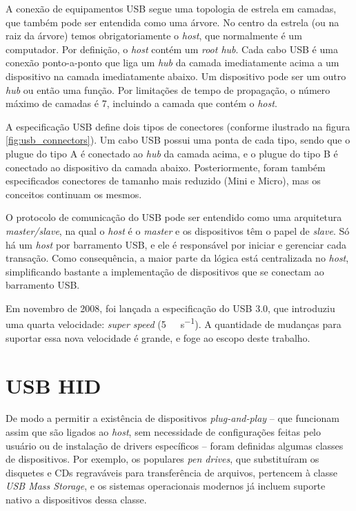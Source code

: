 \documentclass[brazil,pagestart=firstchapter]{abnt}
\begin{document}
A conexão de equipamentos \ac{USB} segue uma topologia de estrela em
camadas, que também pode ser entendida como uma árvore. No centro da estrela
(ou na raiz da árvore) temos obrigatoriamente o \textit{host}, que
normalmente é um computador. Por definição, o \textit{host} contém um
\textit{root hub}. Cada cabo \ac{USB} é uma conexão ponto-a-ponto que liga
um \textit{hub} da camada imediatamente acima a um dispositivo na camada
imediatamente abaixo. Um dispositivo pode ser um outro \textit{hub} ou então
uma função. Por limitações de tempo de propagação, o número máximo de
camadas é 7, incluindo a camada que contém o \textit{host}.
\cite[p.~16]{usb20}

A especificação \ac{USB} define dois tipos de conectores (conforme ilustrado
na figura \ref{fig:usb_connectors}). Um cabo \ac{USB} possui uma ponta de
cada tipo, sendo que o plugue do tipo A é conectado ao \textit{hub} da
camada acima, e o plugue do tipo B é conectado ao dispositivo da camada
abaixo. Posteriormente, foram também especificados conectores de tamanho
mais reduzido (Mini e Micro), mas os conceitos continuam os mesmos.

O protocolo de comunicação do \ac{USB} pode ser entendido como uma
arquitetura \textit{master/slave}, na qual o \textit{host} é o
\textit{master} e os dispositivos têm o papel de \textit{slave}. Só há um
\textit{host} por barramento \ac{USB}, e ele é responsável por iniciar e
gerenciar cada transação.  Como consequência, a maior parte da lógica está
centralizada no \textit{host}, simplificando bastante a implementação de
dispositivos que se conectam ao barramento \ac{USB}. \cite{usbinanutshell}

Em novembro de 2008, foi lançada a especificação do USB 3.0, que introduziu
uma quarta velocidade: \textit{super speed} (\SI{5}{\giga\bit\per\second}).
A quantidade de mudanças para suportar essa nova velocidade é grande, e foge
ao escopo deste trabalho.



\section{USB HID\label{sec:usb_hid}}

De modo a permitir a existência de dispositivos \textit{plug-and-play} --
que funcionam assim que são ligados ao \textit{host}, sem necessidade de
configurações feitas pelo usuário ou de instalação de drivers específicos --
foram definidas algumas classes de dispositivos. Por exemplo, os populares
\textit{pen drives}, que substituíram os disquetes e CDs regraváveis para
transferência de arquivos, pertencem à classe \textit{USB Mass Storage}, e
os sistemas operacionais modernos já incluem suporte nativo a dispositivos
dessa classe.
\end{document}
